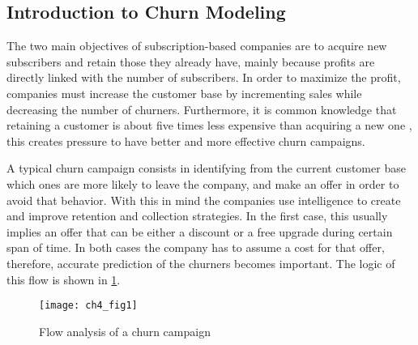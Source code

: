 \subsection{Introduction to Churn Modeling}
\label{sec:4:1:intro}

The two main objectives of subscription-based companies are to  acquire new subscribers and 
retain those they already have, mainly because profits are directly linked with the number of 
subscribers.  In order to maximize the profit, companies must increase the customer base by 
incrementing sales  while decreasing the number of churners. Furthermore, it is common knowledge 
that retaining a  customer is about five times less expensive than acquiring a new one 
\citep{Farris2010}, this creates  pressure to have better and more effective churn campaigns.

A typical churn campaign consists in identifying from the current customer base which ones are 
more likely to leave the company, and make an offer in order to avoid that behavior.
With this in mind the companies use intelligence to create and improve retention and collection
strategies. In the first case, this usually implies an offer that can be either a discount or a 
free upgrade during certain span of time. In both cases the company has to 	assume a cost for that 
offer, therefore, accurate prediction of the churners becomes important. The logic of this flow is 
shown in \figurename{ \ref{fig:ch4:1}}.

	\begin{figure}[htbp]
	  \centering
    \texttt{[image: ch4\_fig1]}   %
	  \caption{Flow analysis of a churn campaign \citep{Verbraken2012}}
	  \label{fig:ch4:1}
	\end{figure}

